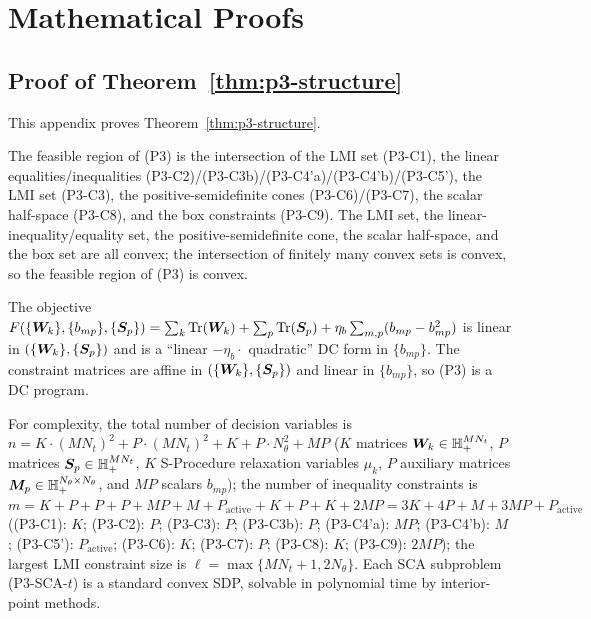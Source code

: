 \chapter{Mathematical Proofs}

\section{Proof of Theorem~\ref{thm:p3-structure}}\label{app:proof-p3}

This appendix proves Theorem~\ref{thm:p3-structure}.

The feasible region of (P3) is the intersection of the LMI set (P3-C1), the linear equalities/inequalities (P3-C2)/(P3-C3b)/(P3-C4'a)/(P3-C4'b)/(P3-C5'), the LMI set (P3-C3), the positive-semidefinite cones (P3-C6)/(P3-C7), the scalar half-space (P3-C8), and the box constraints (P3-C9). The LMI set, the linear-inequality/equality set, the positive-semidefinite cone, the scalar half-space, and the box set are all convex; the intersection of finitely many convex sets is convex, so the feasible region of (P3) is convex.

The objective $F(\{\bm{W}_k\}, \{b_{mp}\}, \{\bm{S}_p\}) = \sum_k \operatorname{Tr}(\bm{W}_k) + \sum_p \operatorname{Tr}(\bm{S}_p) + \eta_b \sum_{m,p} (b_{mp} - b_{mp}^2)$ is linear in $(\{\bm{W}_k\}, \{\bm{S}_p\})$ and is a ``linear $- \eta_b \cdot$ quadratic'' DC form in $\{b_{mp}\}$. The constraint matrices are affine in $(\{\bm{W}_k\}, \{\bm{S}_p\})$ and linear in $\{b_{mp}\}$, so (P3) is a DC program.

For complexity, the total number of decision variables is $n = K \cdot (MN_t)^2 + P \cdot (MN_t)^2 + K + P \cdot N_\theta^2 + MP$ ($K$ matrices $\bm{W}_k \in \mathbb{H}_+^{MN_t}$, $P$ matrices $\bm{S}_p \in \mathbb{H}_+^{MN_t}$, $K$ S-Procedure relaxation variables $\mu_k$, $P$ auxiliary matrices $\bm{M}_p \in \mathbb{H}_+^{N_\theta \times N_\theta}$, and $MP$ scalars $b_{mp}$); the number of inequality constraints is $m = K + P + P + P + MP + M + P_{\text{active}} + K + P + K + 2MP = 3K + 4P + M + 3MP + P_{\text{active}}$ ((P3-C1): $K$; (P3-C2): $P$; (P3-C3): $P$; (P3-C3b): $P$; (P3-C4'a): $MP$; (P3-C4'b): $M$; (P3-C5'): $P_{\text{active}}$; (P3-C6): $K$; (P3-C7): $P$; (P3-C8): $K$; (P3-C9): $2MP$); the largest LMI constraint size is $\ell = \max\{MN_t + 1, 2 N_\theta\}$. Each SCA subproblem (P3-SCA-$t$) is a standard convex SDP, solvable in polynomial time by interior-point methods.

